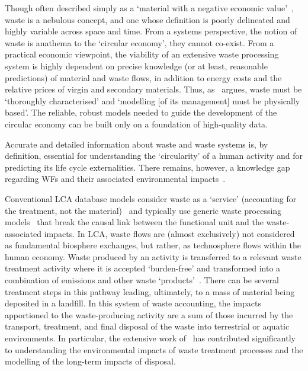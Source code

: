 \documentclass[a4paper,fleqn,longmktitle]{cas-dc}
\begin{document}
Though often described simply as a `material with a negative economic value'~\citep{guinee2004economicallocation}, waste is a nebulous concept, and one whose definition is poorly delineated and highly variable across space and time. From a systems perspective, the notion of waste is anathema to the `circular economy', they cannot co-exist. From a practical economic viewpoint, the viability of an extensive waste processing system is highly dependent on precise knowledge (or at least, reasonable predictions) of material and waste flows, in addition to energy costs and the relative prices of virgin and secondary materials. Thus, as~\cite{bisinella2024wastelca} argues, waste must be `thoroughly characterised' and `modelling [of its management] must be physically based'. The reliable, robust models needed to guide the development of the circular economy can be built only on a foundation of high-quality data.

Accurate and detailed information about waste and waste systems is, by definition, essential for understanding the `circularity' of a human activity and for predicting its life cycle externalities. There remains, however, a knowledge gap regarding WFs and their associated environmental impacts~\citep{laurenti2023wastefootprint}.

Conventional LCA database models consider waste as a `service' (accounting for the treatment, not the material)~\citep{guinee2021wasteisnotaservice} and typically use generic waste processing models~\citep{beylot2018} that break the causal link between the functional unit and the waste-associated impacts. In LCA, waste flows are (almost exclusively) not considered as fundamental biosphere exchanges, but rather, as technosphere flows within the human economy. Waste produced by an activity is transferred to a relevant waste treatment activity where it is accepted `burden-free' and transformed into a combination of emissions and other waste `products'~\citep{guinee2021wasteisnotaservice}. There can be several treatment steps in this pathway leading, ultimately, to a mass of material being deposited in a landfill. In this system of waste accounting, the impacts apportioned to the waste-producing activity are a sum of those incurred by the transport, treatment, and final disposal of the waste into terrestrial or aquatic environments. In particular, the extensive work of~\cite{doka2024publications} has contributed significantly to understanding the environmental impacts of waste treatment processes and the modelling of the long-term impacts of disposal.
\end{document}
